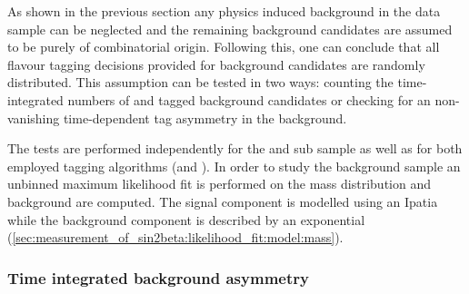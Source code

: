 As shown in the previous section any physics induced background in the data
sample can be neglected and the remaining background candidates are assumed to
be purely of combinatorial origin. Following this, one can conclude that all
flavour tagging decisions provided for background candidates are randomly
distributed. This assumption can be tested in two ways: counting the
time-integrated numbers of \Bd and \Bdbar tagged background candidates or
checking for an non-vanishing time-dependent tag asymmetry in the background. 

The tests are performed independently for the \catDD and \catLL sub sample as
well as for both employed tagging algorithms (\OS and \SSpi). In order to study
the background sample an unbinned maximum likelihood fit is performed on the \Bd
mass distribution and background \sWeights are computed. The signal component is
modelled using an Ipatia \PDF while the background component is described by an
exponential \PDF (\cf \cref{sec:measurement_of_sin2beta:likelihood_fit:model:mass}).

\subsubsection{Time integrated background asymmetry}
\label{sec:measurement_of_sin2beta:physic_backgrounds:tagging_asymmetries:time_integrated}

